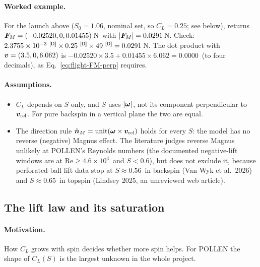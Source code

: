 \paragraph{Worked example.}
For the launch above ($S_0 = 1.06$\assumed, nominal set, so $C_L = 0.25$\derived; see below),
 returns $\bm{F}_M = (-0.02520, 0, 0.01455)$\,\unit{N}\predicted\ with
$|\bm{F}_M| = 0.0291$\,\unit{N}\predicted.
Check: $2.3755\times10^{-3}\derived\times0.25\derived\times49\derived = 0.0291$\,\unit{N}\derived.
The dot product with $\bm{v} = (3.5, 0, 6.062)$ is
$-0.02520\times3.5 + 0.01455\times6.062 = 0.0000$\derived\ (to four decimals), as
Eq.~\eqref{eq:flight-FM-perp} requires.

\paragraph{Assumptions.}
\begin{itemize}
  \item $C_L$ depends on $S$ only, and $S$ uses $|\bm{\omega}|$, not its component perpendicular to
    $\bm{v}_{\mathrm{rel}}$. For pure backspin in a vertical plane the two are equal.
  \item The direction rule $\hat{\bm{n}}_M = \operatorname{unit}(\bm{\omega}\times\bm{v}_{\mathrm{rel}})$
    holds for every $S$: the model has no reverse (negative) Magnus effect.
    The literature judges reverse Magnus unlikely at POLLEN's Reynolds numbers (the documented
    negative-lift windows are at $\mathrm{Re} \ge 4.6\times10^{4}$\assumed\ and $S < 0.6$\assumed),
    but does not exclude it, because perforated-ball lift data stop at $S \approx 0.56$\assumed\ in
    backspin (Van Wyk et al.\ 2026) and $S \approx 0.65$\assumed\ in topspin (Lindsey 2025, an unreviewed
    web article).
\end{itemize}

\subsection{The lift law and its saturation}
\label{sec:flight-lift}

\paragraph{Motivation.}
How $C_L$ grows with spin decides whether more spin helps.
For POLLEN the shape of $C_L(S)$ is the largest unknown in the whole project.

